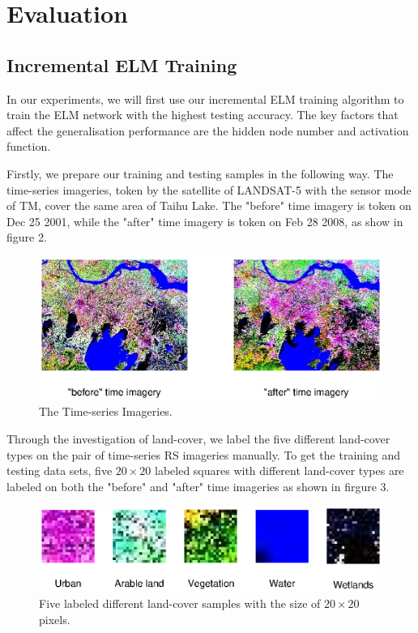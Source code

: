 \documentclass{elsart}
\begin{document}
\section{Evaluation}\label{benchmarkexperiment}
\subsection{Incremental ELM Training}
In our experiments, we will first use our incremental ELM training algorithm to train the ELM network with the highest testing accuracy.
The key factors that affect the generalisation performance are the hidden node number and activation function.\par
Firstly, we prepare our training and testing samples in the following way.
The time-series imageries, token by the satellite of LANDSAT-5 with the sensor mode of TM, cover the same area of Taihu Lake.
The "before" time imagery is token on Dec 25 2001, while the "after" time imagery is token on Feb 28 2008, as show in figure 2.
\begin{figure}[tbh]
\begin{center}
\includegraphics[width=15cm]{tti.eps}
\caption{The Time-series Imageries.}
\label{method}
\end{center}
\end{figure}

Through the investigation of land-cover, we label the five different land-cover types on the pair of time-series RS imageries manually.  
To get the training and testing data sets, five $20\times20$ labeled squares with different land-cover types are labeled on both the "before" and "after" time imageries as shown in firgure 3.
\begin{figure}[tbh]
\begin{center}
\includegraphics[width=15cm]{samples.eps}
\caption{Five labeled different land-cover samples with the size of $20\times20$ pixels.}
\label{method}
\end{center}
\end{figure}
\end{document}
